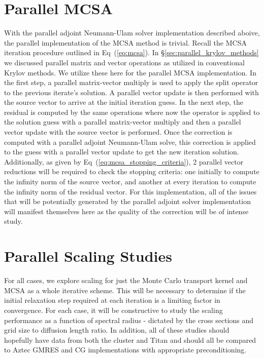 \section{Parallel MCSA}
\label{sec:parallel_mcsa}
With the parallel adjoint Neumann-Ulam solver implementation described
aboive, the parallel implementation of the MCSA method is
trivial. Recall the MCSA iteration procedure outlined in
Eq~(\ref{eq:mcsa}). In \S\ref{sec:parallel_krylov_methods} we
discussed parallel matrix and vector operations as utilized in
conventional Krylov methods. We utilize these here for the parallel
MCSA implementation. In the first step, a parallel matrix-vector
multiply is used to apply the split operator to the previous iterate's
solution. A parallel vector update is then performed with the source
vector to arrive at the initial iteration guess. In the next step, the
residual is computed by the same operations where now the operator is
applied to the solution guess with a parallel matrix-vector multiply
and then a parallel vector update with the source vector is
performed. Once the correction is computed with a parallel adjoint
Neumann-Ulam solve, this correction is applied to the guess with a
parallel vector update to get the new iteration
solution. Additionally, as given by
Eq~(\ref{eq:mcsa_stopping_criteria}), 2 parallel vector reductions
will be required to check the stopping criteria: one initially to
compute the infinity norm of the source vector, and another at every
iteration to compute the infinity norm of the residual vector. For
this implementation, all of the issues that will be potentially
generated by the parallel adjoint solver implementation will manifest
themselves here as the quality of the correction will be of intense
study.

\section{Parallel Scaling Studies}
\label{sec:scaling_studies}
For all cases, we explore scaling for just the Monte Carlo transport
kernel and MCSA as a whole iterative scheme. This will be necessary to
determine if the initial relaxation step required at each iteration is
a limiting factor in convergence. For each case, it will be
constructive to study the scaling performance as a function of
spectral radius - dictated by the cross sections and grid size to
diffusion length ratio. In addition, all of these studies should
hopefully have data from both the cluster and Titan and should all be
compared to Aztec GMRES and CG implementations with appropriate
preconditioning.

